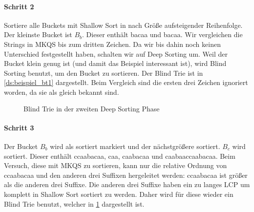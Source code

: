 \paragraph{Schritt 2} Sortiere alle Buckets mit Shallow Sort in nach Größe aufsteigender Reihenfolge.
Der kleinste Bucket ist $B_b$.
Dieser enthält \glqq bacaa\grqq{} und \glqq bacaa\grqq.
Wir vergleichen die Strings in MKQS bis zum dritten Zeichen.
Da wir bis dahin noch keinen Unterschied festgestellt haben, schalten wir auf Deep Sorting um. 
Weil der Bucket klein genug ist (und damit das Beispiel interessant ist), wird Blind Sorting benutzt, um den Bucket zu sortieren.
Der Blind Trie ist in \cref{ds:beispiel_bt1} dargestellt.
Beim Vergleich sind die ersten drei Zeichen ignoriert worden, da sie als gleich bekannt sind.

\begin{figure}
\centering
{}
\caption{Blind Trie in der zweiten Deep Sorting Phase}
\label{ds:beispiel_bt2}
\end{figure}

\paragraph{Schritt 3} Der Bucket $B_b$ wird als sortiert markiert und der nächstgrößere sortiert.
$B_c$ wird sortiert.
Dieser enthält \glqq ccaabacaa\grqq, \glqq caa\grqq, \glqq caabacaa\grqq{} und \glqq caabaaccaabacaa\grqq.
Beim Versuch, diese mit MKQS zu sortieren, kann nur die relative Ordnung von \glqq ccaabacaa\grqq{} und den anderen drei Suffixen hergeleitet werden: \glqq ccaabacaa\grqq{} ist größer als die anderen drei Suffixe.
Die anderen drei Suffixe haben ein zu langes LCP um komplett in Shallow Sort sortiert zu werden.
Daher wird für diese wieder ein Blind Trie benutzt, welcher in \cref{ds:beispiel_bt2} dargestellt ist.


